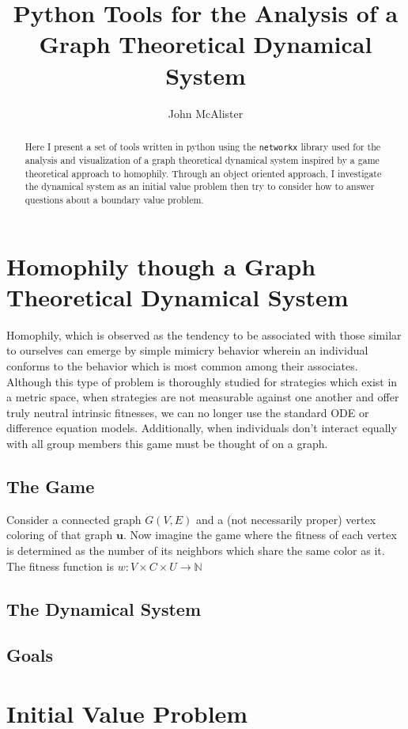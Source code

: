 \documentclass[]{article}
\title{Python Tools for the Analysis of a Graph Theoretical Dynamical System}
\author{John McAlister}
\begin{document}
\maketitle

\begin{abstract}
Here I present a set of tools written in python using the \verb*|networkx| library used for the analysis and visualization of a graph theoretical dynamical system inspired by a game theoretical approach to homophily. Through an object oriented approach, I investigate the dynamical system as an initial value problem then try to consider how to answer questions about a boundary value problem.
\end{abstract}

\section{Homophily though a Graph Theoretical Dynamical System}
Homophily, which is observed as the tendency to be associated with those similar to ourselves can emerge by simple mimicry behavior wherein an individual conforms to the behavior which is most common among their associates. Although this type of problem is thoroughly studied for strategies which exist in a metric space, when strategies are not measurable against one another and offer truly neutral intrinsic fitnesses, we can no longer use the standard ODE or difference equation models. Additionally, when individuals don't interact equally with all group members this game must be thought of on a graph. 
\subsection{The Game}
	Consider a connected graph $G(V,E)$ and a (not necessarily proper) vertex coloring of that graph $\mathbf{u}$. Now imagine the game where the fitness of each vertex is determined as the number of its neighbors which share the same color as it. The fitness function is $w:V\times C\times U\rightarrow \mathbb{N}$
\subsection{The Dynamical System}
\subsection{Goals}
\section{Initial Value Problem}
\end{document}
